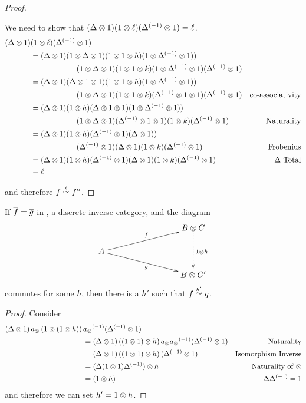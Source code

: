 \begin{proof}
\begin{description}
      We need to show that $(\Delta \otimes 1)(1 \otimes \ell)({\Delta}^{(-1)}\otimes1) = \ell$.
      \begin{align*}
        (\Delta \otimes 1)&(1 \otimes \ell)({\Delta}^{(-1)}\otimes1) \\
        &=
          (\Delta \otimes 1)(1\otimes\Delta \otimes 1)  (1\otimes1 \otimes h ) (1\otimes{\Delta}^{(-1)}\otimes 1))\\
          &\qquad\qquad\qquad
            (1\otimes\Delta \otimes 1) (1\otimes 1 \otimes k) (1\otimes{\Delta}^{(-1)}\otimes 1)({\Delta}^{(-1)}\otimes 1)\\
        &=
          (\Delta \otimes 1)(\Delta \otimes 1\otimes1)  (1\otimes1 \otimes h ) (1\otimes{\Delta}^{(-1)}\otimes 1))\\
          & \qquad\qquad\qquad
            (1\otimes\Delta \otimes 1) (1\otimes 1 \otimes k) ({\Delta}^{(-1)}\otimes1\otimes 1)({\Delta}^{(-1)}\otimes 1)
              &\text{co-associativity}\\
        &=
          (\Delta \otimes 1)  (1 \otimes h ) (\Delta \otimes 1\otimes1)(1\otimes{\Delta}^{(-1)}\otimes 1)) \\
          &\qquad\qquad\qquad
            (1\otimes\Delta \otimes 1)  ({\Delta}^{(-1)}\otimes1\otimes 1)(1 \otimes k)({\Delta}^{(-1)}\otimes 1)&\text{Naturality}\\
        &=
          (\Delta \otimes 1)  (1 \otimes h ) ({\Delta}^{(-1)} \otimes1)(\Delta\otimes 1)) \\
          &\qquad\qquad\qquad
            ({\Delta}^{(-1)} \otimes 1)  (\Delta \otimes 1)(1 \otimes k)({\Delta}^{(-1)}\otimes 1)&\text{Frobenius}\\
        &=
          (\Delta \otimes 1)  (1 \otimes h ) ({\Delta}^{(-1)} \otimes1)
          (\Delta \otimes 1)(1 \otimes k)({\Delta}^{(-1)}\otimes 1)&\Delta\text{ Total}\\
        &= \ell
      \end{align*}
  \end{description}
  and therefore $f\overset{\scriptscriptstyle \ell}{\simeq}f''$.
\end{proof}

\begin{corollary}\label{cor:equivalence_simplified_diagram}
  If $\overline{f} = \overline{g}$ in \X, a discrete inverse category, and the diagram
  \[
    \xymatrix @C=40pt @R=15pt{
      & & B \* C \ar@{.>}[dd]^{1\*h}\\
      A \ar[urr]^f \ar[drr]_{g}\\
      && B\* C'
    }
  \]
  commutes for some $h$, then there is a $h'$ such that $f\overset{\scriptscriptstyle h'}{\simeq}g$.
\end{corollary}
\begin{proof}
  Consider
  \begin{align*}
    (\Delta \otimes1)\,a_{\otimes}\,(1\otimes(1\otimes h))\,&{a_{\otimes}}^{(-1)}({\Delta}^{(-1)}\otimes1)\\
    & = (\Delta \otimes1)\,((1\otimes1)\otimes h)\,a_{\otimes}{a_{\otimes}}^{(-1)}({\Delta}^{(-1)}\otimes1) & \text{Naturality}\\
    &=(\Delta \otimes1)\,((1\otimes1)\otimes h)\,({\Delta}^{(-1)}\otimes1) & \text{Isomorphism Inverse}\\
    &=(\Delta (1\otimes1) {\Delta}^{(-1)})\otimes h & \text{Naturality of }\otimes\\
    &=(1\otimes h) & \Delta  {\Delta}^{(-1)}=1\\
  \end{align*}
  and therefore we can set $h' = 1 \otimes h$.
\end{proof}




